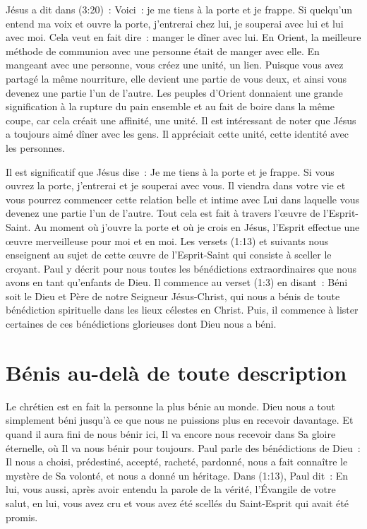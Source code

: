 Jésus a dit dans (3:20)~:
 \og Voici~: je me tiens à la porte et je frappe.
 Si quelqu'un entend ma voix et ouvre la porte,
 j'entrerai chez lui, je souperai avec lui et lui avec moi. \fg{}
 Cela veut en fait dire~: \og manger le dîner avec lui. \fg{}
 En Orient, la meilleure méthode de communion avec une personne
 était de manger avec elle. En mangeant avec une personne,
 vous créez une unité, un lien.
 Puisque vous avez partagé la même nourriture, elle devient une partie
 de vous deux, et ainsi vous devenez une partie l'un de l'autre.
 Les peuples d'Orient donnaient une grande signification à la rupture
 du pain ensemble et au fait de boire dans la même coupe,
 car cela créait une affinité, une unité.
 Il est intéressant de noter que Jésus a toujours aimé dîner avec les gens.
 Il appréciait cette unité, cette identité avec les personnes.


Il est significatif que Jésus dise~:
 \og Je me tiens à la porte et je frappe.
 Si vous ouvrez la porte, j'entrerai et je souperai avec vous. \fg{}
 Il viendra dans votre vie et vous pourrez commencer cette relation belle
 et intime avec Lui dans laquelle vous devenez une partie l'un de l'autre.
 Tout cela est fait à travers l'œuvre de l'Esprit-Saint.
 Au moment où j'ouvre la porte et où je crois en Jésus,
 l'Esprit effectue une œuvre merveilleuse pour moi et en moi.
 Les versets (1:13) et suivants nous enseignent
 au sujet de cette œuvre de l'Esprit-Saint qui consiste à sceller le croyant.
 Paul y décrit pour nous toutes les bénédictions extraordinaires
 que nous avons en tant qu'enfants de Dieu.
 Il commence au verset (1:3) en disant~:
 \og Béni soit le Dieu et Père de notre Seigneur Jésus-Christ,
 qui nous a bénis de toute bénédiction spirituelle
 dans les lieux célestes en Christ. \fg{}
 Puis, il commence à lister certaines de ces bénédictions glorieuses
 dont Dieu nous a béni.
 \nowidow


\section{B\'enis au-del\`a de toute description}

Le chrétien est en fait la personne la plus bénie au monde.
 Dieu nous a tout simplement béni jusqu'à ce que nous ne puissions plus
 en recevoir davantage.
 Et quand il aura fini de nous bénir ici, Il va encore nous recevoir
 dans Sa gloire éternelle, où Il va nous bénir pour toujours.
 Paul parle des bénédictions de Dieu~: Il nous a choisi, prédestiné,
 accepté, racheté, pardonné, nous a fait connaître
 le mystère de Sa volonté, et nous a donné un héritage.
 Dans (1:13), Paul dit~:
 \og En lui, vous aussi, après avoir entendu la parole de la vérité,
 l'Évangile de votre salut, en lui, vous avez cru et vous avez été scellés
 du Saint-Esprit qui avait été promis. \fg{}

